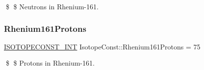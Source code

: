 \$ \$ Neutrons in Rhenium-\/161. \mbox{\label{group___isotope_const-_rhenium-_re161_ga8485b1902efd3a436e008e900778d99b}} 
\subsubsection{\texorpdfstring{Rhenium161\+Protons}{Rhenium161Protons}}
{\footnotesize\ttfamily \mbox{\hyperlink{group___isotope_const-_macros_ga5f18360b3e99483a35c32d789e62621c}{I\+S\+O\+T\+O\+P\+E\+C\+O\+N\+S\+T\+\_\+\+I\+NT}} Isotope\+Const\+::\+Rhenium161\+Protons = 75}

\$ \$ Protons in Rhenium-\/161. 